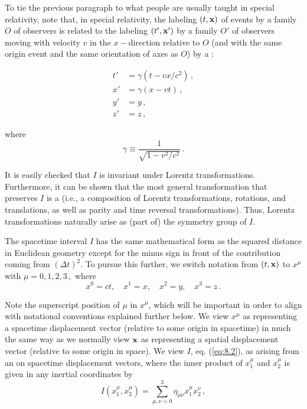 To tie the previous paragraph to what people are usually taught in special relativity, note that, in special relativity, 
the labeling $(t, \vb{x})$ of events by a family $O$ of observers is related to the labeling $(t', \vb{x}')$ by a family $O'$ of observers moving with velocity $v$ in the $x-$direction relative to $O$ (and with the same origin event and the same orientation of axes as $O$) by a :

\begin{equation}\label{eq:8.3}
\begin{aligned}
t' &= \gamma (t - vx/c^2)\,,\\
x' &= \gamma (x - vt)\,,\\
y' &= y\,,\\
z' &= z\,,
\end{aligned}
\end{equation}

where   
\begin{equation}\label{eq:8.4}
\gamma \equiv \frac{1}{\sqrt{1 - v^2/c^2}}\,.
\end{equation}

It is easily checked that $I$ is invariant under Lorentz transformations. Furthermore, it can be shown that the most general transformation that preserves $I$ is a  (i.e., a composition of Lorentz transformations, rotations, and translations, as well as parity and time reversal transformations). Thus, Lorentz transformations naturally arise as (part of) the symmetry group of $I$.

The spacetime interval $I$ has the same mathematical form as the squared distance in Euclidean geometry except for the minus sign in front of the contribution coming from $(\Delta t)^2$. To pursue this further, we switch notation from $(t, \vb{x})$ to $x^\mu$ with $\mu=0, 1, 2, 3\,,$ where 
\begin{equation}\label{eq:8.5}
x^0 = ct,\quad x^1 = x,\quad x^2 = y,\quad x^3 = z\,.
\end{equation}

Note the superscript position of $\mu$ in $x^\mu$, which will be important in order to align with notational conventions explained further below. We view $x^\mu$ as representing a spacetime displacement vector (relative to some origin in spacetime) in much the same way as we normally view $\vb{x}$ as representing a spatial displacement vector (relative to some origin in space). We view $I$, eq. (\ref{eq:8.2}), as arising from an  on spacetime displacement vectors, where the inner product of $x^\mu_1$ and $x^\mu_2$ is given in any inertial coordinates by 
\begin{equation}\label{eq:8.6}
I(x^\mu_1, x^\mu_2)  = \sum_{\mu,\nu=0}^{3} \eta_{\mu \nu} x^\mu_1 x^\nu_2\,,
\end{equation}

